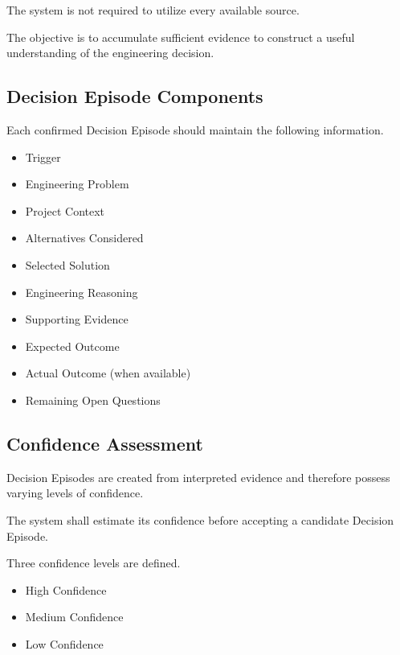The system is not required to utilize every available source.

The objective is to accumulate sufficient evidence to construct a useful understanding of the engineering decision.

\vspace{0.5cm}

\subsection{Decision Episode Components}

Each confirmed Decision Episode should maintain the following information.

\begin{itemize}
    \item Trigger
    \item Engineering Problem
    \item Project Context
    \item Alternatives Considered
    \item Selected Solution
    \item Engineering Reasoning
    \item Supporting Evidence
    \item Expected Outcome
    \item Actual Outcome (when available)
    \item Remaining Open Questions
\end{itemize}

\vspace{0.5cm}

\subsection{Confidence Assessment}

Decision Episodes are created from interpreted evidence and therefore possess varying levels of confidence.

The system shall estimate its confidence before accepting a candidate Decision Episode.

Three confidence levels are defined.

\begin{itemize}
    \item High Confidence
    \item Medium Confidence
    \item Low Confidence
\end{itemize}

